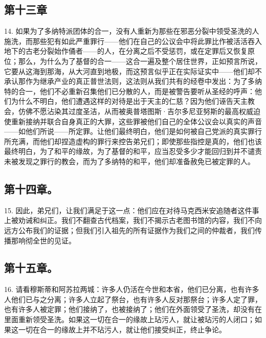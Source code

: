 
\subsection{第十三章}

14. 如果为了多纳特派团体的合一，没有人重新为那些在邪恶分裂中领受圣洗的人施洗，而那些犯有如此严重罪行——他们在自己的公议会中将此罪比作被活活吞入地下的古老分裂始作俑者——的人，在分离之后不受惩罚，或在定罪后又恢复原位；那么，为什么为了基督的合一——这合一遍及整个居住世界，正如预言所说，它要从这海到那海，从大河直到地极，而这预言似乎正在实际证实中——他们却不承认那作为继承产业的真正普世法则，这法则从我们共有的经卷中发出：为了多纳特的合一，他们不必重新召集他们已分散的人，而是被警告要听从圣经的呼声：他们为什么不明白，他们遭遇这样的对待是出于天主的仁慈？因为他们诬告天主教会，仿佛不愿沾染其过度圣洁，从而被奥普塔图斯·吉尔多尼亚努斯的最高权威迫使重新接纳并联合自身真正的大罪，这些罪被他们自己的全体公议会以真实的声音——如他们所说——所定罪。让他们最终明白，他们是如何被自己党派的真实罪行所充满，而他们却捏造虚构的罪行来控告弟兄们；即使那些指控是真的，他们也该最终明白，为了和平的缘故，为了基督的和平，应当忍受多少才能回归到并不谴责未被发现之罪行的教会，而为了多纳特的和平，他们却准备赦免已被定罪的人。\par


\subsection{第十四章。}

15. 因此，弟兄们，让我们满足于这一点：他们应在对待马克西米安追随者这件事上被劝诫和纠正。我们不翻查古代档案，我们不揭示古老图书馆的内容，我们不向远方公布我们的证据；但我们引入祖先的所有证据作为我们之间的仲裁者，我们传播那响彻全世的见证。\par


\subsection{第十五章。}

16. 请看穆斯蒂和阿苏拉两城：许多人仍活在今世和本省，他们已分离，也有许多人他们已与之分离；许多人立起了祭台，也有许多人反对那祭台；许多人定了罪，也有许多人被定罪；他们接纳了，也被接纳了；他们在外面领受了圣洗，却没有在里面重新领受圣洗。如果这一切在合一的缘故上玷污人，就让被玷污的人闭口；如果这一切在合一的缘故上并不玷污人，就让他们接受纠正，终止争论。\par

